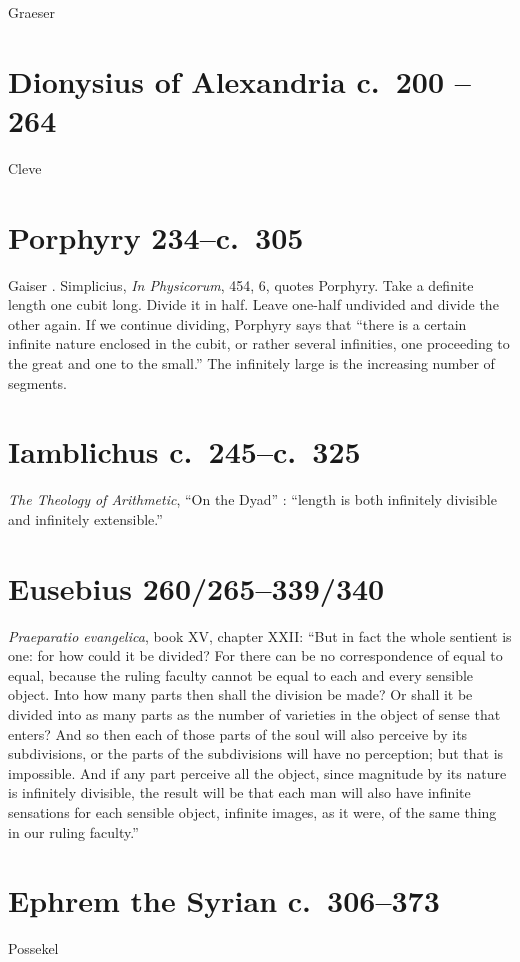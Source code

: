 \documentclass{amsart}
\theoremstyle{definition}
\begin{document}
Graeser \cite{graeser}


\section{Dionysius of Alexandria c.~200 -- 264}
Cleve \cite{cleve}



\section{Porphyry 234--c.~305}
Gaiser \cite[p.~482]{gaiser}. Simplicius, {\em In Physicorum}, 454, 6, quotes Porphyry. Take a definite length one cubit long.
Divide it in half. Leave one-half undivided and divide the other again. If we continue dividing, Porphyry says that ``there is a certain
infinite nature enclosed in the cubit, or rather several infinities, one proceeding to the great and one to the small.'' The infinitely large is the increasing
number of segments.

\section{Iamblichus c.~245--c.~325}
{\em The Theology of Arithmetic}, ``On the Dyad'' \cite[p.~45]{iamblichus}: ``length is both infinitely divisible and infinitely extensible.''




\section{Eusebius 260/265--339/340}
{\em Praeparatio evangelica}, book XV, chapter XXII: ``But in fact the whole sentient is one: for how could it be divided? For there can be no correspondence of equal to equal, because the ruling faculty cannot be equal to each and every sensible object. Into how many parts then shall the division be made? Or shall it be divided into as many parts as the number of varieties in the object of sense that enters? And so then each of those parts of the soul will also perceive by its subdivisions, or the parts of the subdivisions will have no perception; but that is impossible. And if any part perceive all the object, since magnitude by its nature is infinitely divisible, the result will be that each man will also have infinite sensations for each sensible object, infinite images, as it were, of the same thing in our ruling faculty.''

\section{Ephrem the Syrian c.~306--373}
Possekel \cite{possekel}
\end{document}
